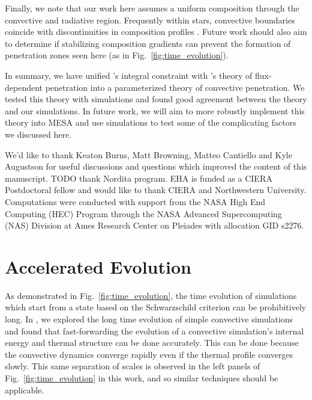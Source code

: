 \documentclass[twocolumn]{aastex631}
\begin{document}
Finally, we note that our work here assumes a uniform composition through the convective and radiative region.
Frequently within stars, convective boundaries coincide with discontinuities in composition profiles \citep{salaris_cassisi_2017}.
Future work should also aim to determine if stabilizing composition gradients can prevent the formation of penetration zones seen here (as in Fig.~\ref{fig:time_evolution}).

In summary, we have unified \citet{roxburgh1989}'s integral constraint with \citet{zahn1991}'s theory of flux-dependent penetration into a parameterized theory of convective penetration.
We tested this theory with simulations and found good agreement between the theory and our simulations.
In future work, we will aim to more robustly implement this theory into MESA and use simulations to test some of the complicating factors we discussed here.





\begin{acknowledgments}
We'd like to thank Keaton Burns, Matt Browning, Matteo Cantiello and Kyle Augustson for useful discussions and questions which improved the content of this manuscript.
TODO thank Nordita program.
EHA is funded as a CIERA Postdoctoral fellow and would like to thank CIERA and Northwestern University. 
Computations were conducted with support from the NASA High End Computing (HEC) Program through the NASA Advanced Supercomputing (NAS) Division at Ames Research Center on Pleiades with allocation GID s2276.
\end{acknowledgments}


\appendix

\section{Accelerated Evolution}
\label{app:accelerated_evolution}
As demonstrated in Fig.~\ref{fig:time_evolution}, the time evolution of simulations which start from a state based on the Schwarzschild criterion can be prohibitively long.
In \citet{anders_etal_2018}, we explored the long time evolution of simple convective simulations and found that fast-forwarding the evolution of a convective simulation's internal energy and thermal structure can be done accurately.
This can be done because the convective dynamics converge rapidly even if the thermal profile converges slowly.
This same separation of scales is observed in the left panels of Fig.~\ref{fig:time_evolution} in this work, and so similar techniques should be applicable.
\end{document}
